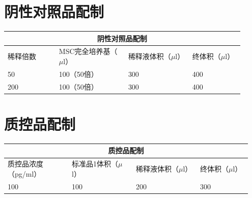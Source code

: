 \documentclass[UTF8,10pt,a4paper,fontset=fandol]{ctexart}
\newcommand{\fieldvalue}[1]{#1}
\newcommand{\handwritten}[1]{#1}
\begin{document}
\newpage

\section*{阴性对照品配制}

\begin{center}
\small
\begin{tabular}{|p{0.20\linewidth}|p{0.27\linewidth}|p{0.25\linewidth}|p{0.20\linewidth}|}
\hline
\multicolumn{4}{|c|}{阴性对照品配制}\\
\hline
稀释倍数 & MSC完全培养基（$\mu$l） & 稀释液体积（$\mu$l） & 终体积（$\mu$l）\\
\hline
\fieldvalue{\handwritten{50}} &
\fieldvalue{\handwritten{100（50倍）}} &
\fieldvalue{\handwritten{300}} &
\fieldvalue{\handwritten{400}}\\
\hline
\fieldvalue{\handwritten{200}} &
\fieldvalue{\handwritten{100（50倍）}} &
\fieldvalue{\handwritten{300}} &
\fieldvalue{\handwritten{400}}\\
\hline
\end{tabular}
\end{center}

\section*{质控品配制}

\begin{center}
\small
\begin{tabular}{|p{0.25\linewidth}|p{0.25\linewidth}|p{0.25\linewidth}|p{0.20\linewidth}|}
\hline
\multicolumn{4}{|c|}{质控品配制}\\
\hline
质控品浓度（pg/ml） & 标准品1体积（$\mu$l） & 稀释液体积（$\mu$l） & 终体积（$\mu$l）\\
\hline
\fieldvalue{\handwritten{100}} &
\fieldvalue{\handwritten{100}} &
\fieldvalue{\handwritten{200}} &
\fieldvalue{\handwritten{300}}\\
\hline
\end{tabular}
\end{center}
\end{document}
